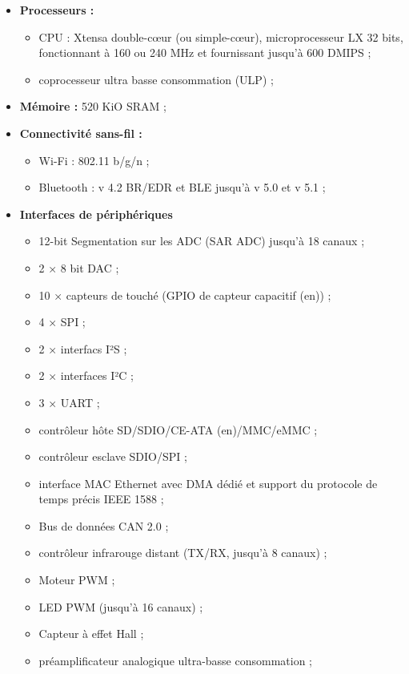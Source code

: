 \begin{itemize}
    \item[\textbullet]\textbf{Processeurs :}
        \begin{itemize}
            \item CPU : Xtensa double-cœur (ou simple-cœur), microprocesseur LX 32 bits, fonctionnant 
                à 160 ou 240 MHz et fournissant jusqu'à 600 DMIPS ;

            \item coprocesseur ultra basse consommation (ULP) ;
        \end{itemize}

    \item[\textbullet]\textbf{Mémoire :} 520 KiO SRAM ;

    \item[\textbullet]\textbf{Connectivité sans-fil :}
        \begin{itemize}
            \item Wi-Fi : 802.11 b/g/n ;

            \item Bluetooth : v 4.2 BR/EDR et BLE jusqu'à v 5.0 et v 5.1 ;
        \end{itemize}

    \item[\textbullet]\textbf{Interfaces de périphériques}
        \begin{itemize}
            \item 12-bit Segmentation sur les ADC (SAR ADC) jusqu'à 18 canaux ;
            \item 2 × 8 bit DAC ;
            \item 10 × capteurs de touché (GPIO de capteur capacitif (en)) ;
            \item 4 × SPI ;
            \item 2 × interfacs I²S ;
            \item 2 × interfaces I²C ;
            \item 3 × UART ;
            \item contrôleur hôte SD/SDIO/CE-ATA (en)/MMC/eMMC ;
            \item contrôleur esclave SDIO/SPI ;
            \item interface MAC Ethernet avec DMA dédié et support du protocole de temps précis IEEE 1588 ;
            \item Bus de données CAN 2.0 ;
            \item contrôleur infrarouge distant (TX/RX, jusqu'à 8 canaux) ;
            \item Moteur PWM ;
            \item LED PWM (jusqu'à 16 canaux) ;
            \item Capteur à effet Hall ;
            \item préamplificateur analogique ultra-basse consommation ;
        \end{itemize}


\end{itemize}
